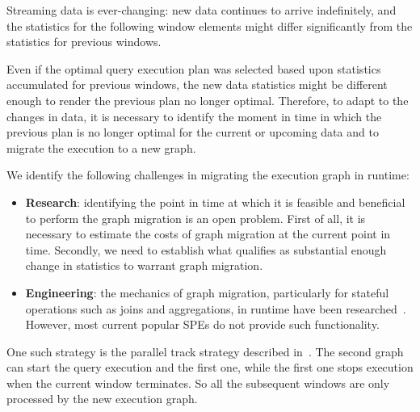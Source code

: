 Streaming data is ever-changing: new data continues to arrive indefinitely, and the statistics for the following window elements might differ significantly from the statistics for previous windows. 

Even if the optimal query execution plan was selected based upon statistics accumulated for previous windows, the new data statistics might be different enough to render the previous plan no longer optimal. Therefore, to adapt to the changes in data, it is necessary to identify the moment in time in which the previous plan is no longer optimal for the current or upcoming data and to migrate the execution to a new graph. 

We identify the following challenges in migrating the execution graph in runtime:
\begin{itemize}
 \item \textbf{Research}: identifying the point in time at which it is feasible and beneficial to perform the graph migration is an open problem. First of all, it is necessary to estimate the costs of graph migration at the current point in time. Secondly, we need to establish what qualifies as substantial enough change in statistics to warrant graph migration. 

 \item \textbf{Engineering}: 
    the mechanics of graph migration, particularly for stateful operations such as joins and aggregations, in runtime have been researched~\cite{zhu2004dynamic}.
 However, most current popular SPEs do not provide such functionality. 
   \end{itemize}
One such strategy is the parallel track strategy described in~\cite{zhu2004dynamic}. 
The second graph can start the query execution and the first one, while the first one stops execution when the current window terminates. So all the subsequent windows are only processed by the new execution graph.

